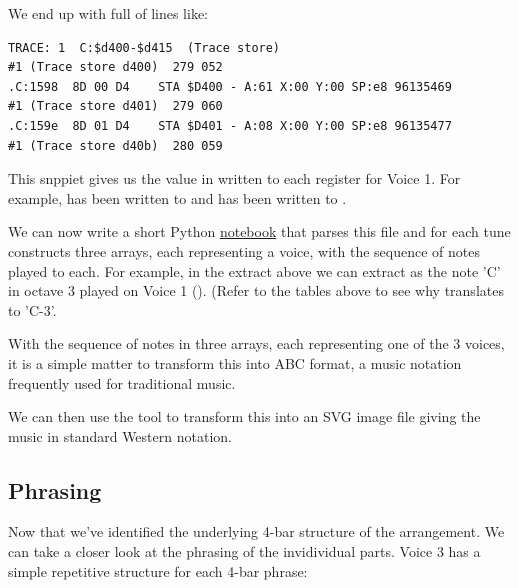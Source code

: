 \begin{definition}
We end up with  full of lines like:

\begin{lstlisting}[basicstyle=\footnotesize\ttfamily,escapechar=\%]
TRACE: 1  C:$d400-$d415  (Trace store)
#1 (Trace store d400)  279 052
.C:1598  8D 00 D4    STA $D400 - A:61 X:00 Y:00 SP:e8 96135469
#1 (Trace store d401)  279 060
.C:159e  8D 01 D4    STA $D401 - A:08 X:00 Y:00 SP:e8 96135477
#1 (Trace store d40b)  280 059
\end{lstlisting}

This snppiet gives us the value in  written to each register for Voice 1. For example, 
has been written to  and  has been written to .

We can now write a short Python \href{https://github.com/mwenge/iatheory/tree/main/notebooks}{notebook} that
parses this file and for each tune constructs three arrays, each representing a voice, with the sequence
of notes played to each. For example, in the extract above we can extract  as the note 'C'
in octave 3 played on Voice 1 (). (Refer to the tables above to see why 
translates to 'C-3'.

With the sequence of notes in three arrays, each representing one of the 3 voices, it is a simple
matter to transform this into ABC format, a music notation frequently used for traditional music.
\end{definition}
\clearpage
\begin{definition}
\setlength{\intextsep}{0pt}%
\setlength{\columnsep}{3pt}%
\small



  We can then use the tool  to transform this into an SVG image file giving the music in
standard Western notation.

\end{definition}

\subsection{Phrasing}
Now that we've identified the underlying 4-bar structure of the arrangement. We can take a closer look at the 
phrasing of the invidividual parts. Voice 3 has a simple repetitive structure for each 4-bar phrase:

